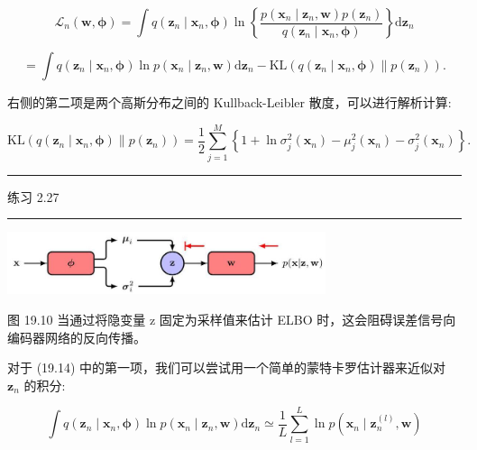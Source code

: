 \documentclass[10pt]{report}
\newcommand{\HRule}{\begin{center}\rule{0.9\linewidth}{0.2mm}\end{center}}
\begin{document}
\[
{\mathcal{L}}_{n}\left( {\mathbf{w},\mathbf{\phi }}\right)  = \int q\left( {{\mathbf{z}}_{n} \mid  {\mathbf{x}}_{n},\mathbf{\phi }}\right) \ln \left\{  \frac{p\left( {{\mathbf{x}}_{n} \mid  {\mathbf{z}}_{n},\mathbf{w}}\right) p\left( {\mathbf{z}}_{n}\right) }{q\left( {{\mathbf{z}}_{n} \mid  {\mathbf{x}}_{n},\mathbf{\phi }}\right) }\right\}  \mathrm{d}{\mathbf{z}}_{n}
\]

\[
= \int q\left( {{\mathbf{z}}_{n} \mid  {\mathbf{x}}_{n},\mathbf{\phi }}\right) \ln p\left( {{\mathbf{x}}_{n} \mid  {\mathbf{z}}_{n},\mathbf{w}}\right) \mathrm{d}{\mathbf{z}}_{n} - \mathrm{{KL}}\left( {q\left( {{\mathbf{z}}_{n} \mid  {\mathbf{x}}_{n},\mathbf{\phi }}\right) \parallel p\left( {\mathbf{z}}_{n}\right) }\right) . \tag{19.14}
\]

右侧的第二项是两个高斯分布之间的 Kullback-Leibler 散度，可以进行解析计算:

\[
\mathrm{{KL}}\left( {q\left( {{\mathbf{z}}_{n} \mid  {\mathbf{x}}_{n},\mathbf{\phi }}\right) \parallel p\left( {\mathbf{z}}_{n}\right) }\right)  = \frac{1}{2}\mathop{\sum }\limits_{{j = 1}}^{M}\left\{  {1 + \ln {\sigma }_{j}^{2}\left( {\mathbf{x}}_{n}\right)  - {\mu }_{j}^{2}\left( {\mathbf{x}}_{n}\right)  - {\sigma }_{j}^{2}\left( {\mathbf{x}}_{n}\right) }\right\}  . \tag{19.15}
\]

\HRule

练习 2.27

\HRule

\begin{center}
\includegraphics[max width=0.7\textwidth]{images/0194e279-9b28-703a-88f4-c3ac21e2010d_594_594_354_872_171_0.jpg}
\end{center}
\hspace*{3em} 

图 19.10 当通过将隐变量 \(\mathrm{z}\) 固定为采样值来估计 ELBO 时，这会阻碍误差信号向编码器网络的反向传播。

对于 (19.14) 中的第一项，我们可以尝试用一个简单的蒙特卡罗估计器来近似对 \({\mathbf{z}}_{n}\) 的积分:

\[
\int q\left( {{\mathbf{z}}_{n} \mid  {\mathbf{x}}_{n},\mathbf{\phi }}\right) \ln p\left( {{\mathbf{x}}_{n} \mid  {\mathbf{z}}_{n},\mathbf{w}}\right) \mathrm{d}{\mathbf{z}}_{n} \simeq  \frac{1}{L}\mathop{\sum }\limits_{{l = 1}}^{L}\ln p\left( {{\mathbf{x}}_{n} \mid  {\mathbf{z}}_{n}^{\left( l\right) },\mathbf{w}}\right)  \tag{19.16}
\]
\end{document}
